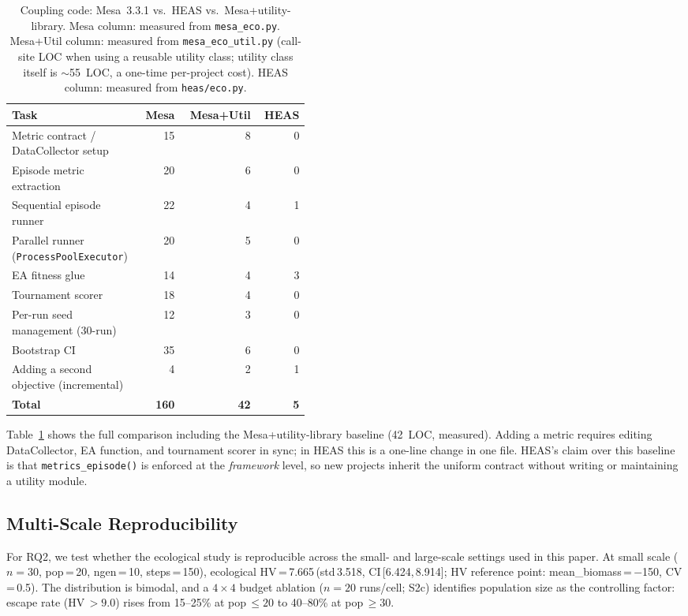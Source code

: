 \documentclass{wscpaperproc}
\begin{document}
\begin{table}[ht]
\caption{Coupling code: Mesa~3.3.1 vs.\ HEAS vs.\ Mesa+utility-library.
  Mesa column: measured from \texttt{mesa\_eco.py}.
  Mesa+Util column: measured from \texttt{mesa\_eco\_util.py} (call-site LOC
  when using a reusable utility class; utility class itself is $\sim$55~LOC,
  a one-time per-project cost). HEAS column: measured from \texttt{heas/eco.py}.}
\label{tab:loc}
\centering\small
\begin{tabular}{p{0.44\linewidth}rrr}
\toprule
Task & Mesa & Mesa+Util & HEAS \\
\midrule
Metric contract / DataCollector setup   & 15 & 8  & 0 \\
Episode metric extraction               & 20 & 6  & 0 \\
Sequential episode runner               & 22 & 4  & 1 \\
Parallel runner (\texttt{ProcessPoolExecutor}) & 20 & 5  & 0 \\
EA fitness glue                         & 14 & 4  & 3 \\
Tournament scorer                       & 18 & 4  & 0 \\
Per-run seed management (30-run)        & 12 & 3  & 0 \\
Bootstrap CI                            & 35 & 6  & 0 \\
Adding a second objective (incremental) & 4  & 2  & 1 \\
\midrule
\textbf{Total}                          & \textbf{160} & \textbf{42} & \textbf{5} \\
\bottomrule
\end{tabular}
\end{table}

Table~\ref{tab:loc} shows the full comparison including the Mesa+utility-library
baseline (42~LOC, measured). Adding a metric requires editing DataCollector, EA
function, and tournament scorer in sync; in HEAS this is a one-line change in one
file. HEAS's claim over this baseline is that
\texttt{metrics\_episode()} is enforced at the \emph{framework} level, so new
projects inherit the uniform contract without writing or maintaining a
utility module.

\subsection{Multi-Scale Reproducibility}
\label{sec:multiscale}

For RQ2, we test whether the ecological study is reproducible across the
small- and large-scale settings used in this paper. At small scale
($n\!=\!30$, pop\,=\,20, ngen\,=\,10, steps\,=\,150),
ecological HV\,=\,7.665\,(std\,3.518, CI\,[6.424,\,8.914]; HV reference point:
mean\_biomass\,=\,$-$150, CV\,=\,0.5).
The distribution is bimodal, and a $4\!\times\!4$ budget ablation
($n\!=\!20$ runs/cell; S2c) identifies population size as the controlling
factor: escape rate (HV\,$>\!9.0$) rises from 15--25\% at pop\,$\le\!20$ to
40--80\% at pop\,$\ge\!30$.
\end{document}
